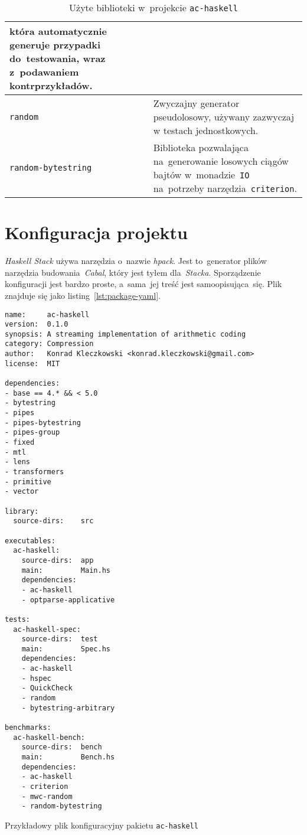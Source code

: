 \documentclass[../../praca.tex]{subfiles}
\begin{document}
\begin{table}
\begin{tabular}{|l|p{8cm}|}
                                  która automatycznie generuje przypadki do~testowania, wraz z~podawaniem kontrprzykładów. \\ \hline
    \texttt{random}             & Zwyczajny generator pseudolosowy, używany 
                                  zazwyczaj w testach jednostkowych. \\ \hline
    \texttt{random-bytestring}  & Biblioteka pozwalająca na~generowanie losowych ciągów bajtów
                                  w~monadzie~\texttt{IO} na~potrzeby narzędzia~\texttt{criterion}. \\ \hline
  \end{tabular}
  \caption{Użyte biblioteki w~projekcie \texttt{ac-haskell}}
  \label{tab:libs}
\end{table}

\section{Konfiguracja projektu}

\emph{Haskell Stack} używa narzędzia o~nazwie \emph{hpack}. 
Jest to~generator plików narzędzia budowania~\emph{Cabal},
który jest tyłem dla~\emph{Stacka}. Sporządzenie konfiguracji
jest bardzo proste, a~sama~jej treść jest samoopisująca~się. 
Plik znajduje się jako listing~\ref{lst:package-yaml}.


\begin{listing}
  \begin{verbatim}
name:     ac-haskell
version:  0.1.0
synopsis: A streaming implementation of arithmetic coding
category: Compression
author:   Konrad Kleczkowski <konrad.kleczkowski@gmail.com>
license:  MIT

dependencies:
- base == 4.* && < 5.0
- bytestring
- pipes
- pipes-bytestring
- pipes-group
- fixed
- mtl
- lens
- transformers
- primitive
- vector

library:
  source-dirs:    src

executables:
  ac-haskell:
    source-dirs:  app
    main:         Main.hs
    dependencies:
    - ac-haskell
    - optparse-applicative

tests:
  ac-haskell-spec:
    source-dirs:  test
    main:         Spec.hs
    dependencies:
    - ac-haskell
    - hspec
    - QuickCheck
    - random
    - bytestring-arbitrary

benchmarks:
  ac-haskell-bench:
    source-dirs:  bench
    main:         Bench.hs
    dependencies:
    - ac-haskell
    - criterion
    - mwc-random
    - random-bytestring
  \end{verbatim}
  \caption{Przykładowy plik konfiguracyjny pakietu \texttt{ac-haskell}}
  \label{lst:package-yaml}
\end{listing}
\end{document}
